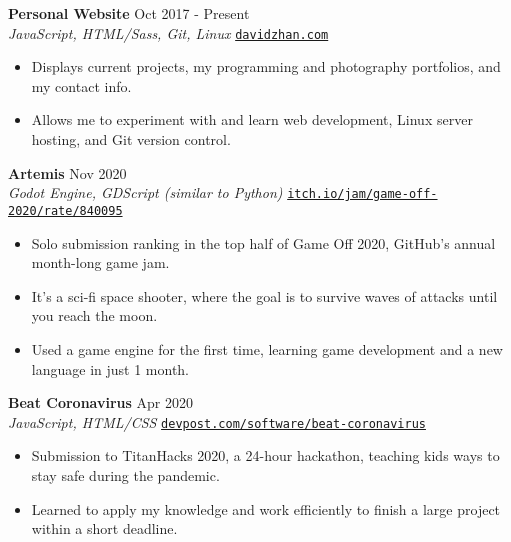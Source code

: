 \documentclass[letterpaper,10pt]{extarticle}
\begin{document}
\noindent
\textbf{Personal Website} \hfill Oct 2017 - Present\\ %
\textit{JavaScript, HTML/Sass, Git, Linux} \hfill \texttt{\href{https://davidzhan.com}{davidzhan.com}} %
\begin{itemize}
    \item Displays current projects, my programming and photography portfolios, and my contact info.
    \item Allows me to experiment with and learn web development, Linux server hosting, and Git version control. %
\end{itemize}

\noindent
\textbf{Artemis} \hfill Nov 2020\\ %
\textit{Godot Engine, GDScript (similar to Python)} \hfill \texttt{\href{https://itch.io/jam/game-off-2020/rate/840095}{itch.io/jam/game-off-2020/rate/840095}}
\begin{itemize}
    \item Solo submission ranking in the top half of Game Off 2020, GitHub's annual month-long game jam.
    \item It's a sci-fi space shooter, where the goal is to survive waves of attacks until you reach the moon.
    \item Used a game engine for the first time, learning game development and a new language in just 1 month.
\end{itemize}

\noindent
\textbf{Beat Coronavirus} \hfill Apr 2020\\ %
\textit{JavaScript, HTML/CSS} \hfill \texttt{\href{https://devpost.com/software/beat-coronavirus}{devpost.com/software/beat-coronavirus}}
\begin{itemize}
    \item Submission to TitanHacks 2020, a 24-hour hackathon, teaching kids ways to stay safe during the pandemic.
    \item Learned to apply my knowledge and work efficiently to finish a large project within a short deadline.
\end{itemize}
\end{document}
